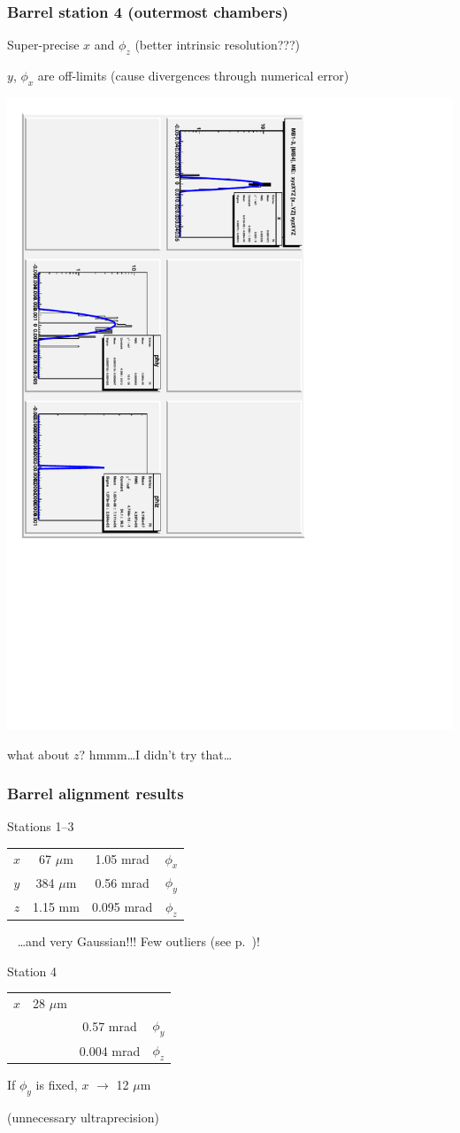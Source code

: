 \documentclass[compress]{beamer}
\begin{document}
\begin{frame}
\frametitle{Barrel station 4 (outermost chambers)}
Super-precise $x$ and $\phi_z$ (better intrinsic resolution???) 

$y$, $\phi_x$ are off-limits (cause divergences through numerical error)
\begin{center}
\includegraphics[height=0.75\linewidth, angle=90]{xyzXYZ_xYZ_xyzXYZ_barrelsurface.pdf}
\end{center}
what about $z$?  hmmm\ldots I didn't try that\ldots
\end{frame}

\begin{frame}
\frametitle{Barrel alignment results}
\hspace{1.5 cm} Stations 1--3
\begin{center}
\begin{tabular}{c c | c c}
\hline\hline
$x$ & 67 $\mu$m & 1.05 mrad & $\phi_x$ \\
$y$ & 384 $\mu$m & 0.56 mrad & $\phi_y$ \\
$z$ & 1.15 mm & 0.095 mrad & $\phi_z$ \\
\hline\hline
\end{tabular}
\end{center}
\mbox{ } \hfill \ldots and very Gaussian!!!  Few outliers (see p.\ \pageref{pagefive})!

\vfill
\hspace{1.5 cm} Station 4
\begin{center}
\begin{tabular}{c c | c c}
\hline\hline
$x$ & 28 $\mu$m &  \\
    &           & 0.57 mrad & $\phi_y$ \\
    &           & 0.004 mrad & $\phi_z$ \\
\hline\hline
\end{tabular}

\vspace{0.2 cm}
If $\phi_y$ is fixed, $x$ $\to$ 12 $\mu$m

(unnecessary ultraprecision)
\end{center}
\end{frame}
\end{document}

